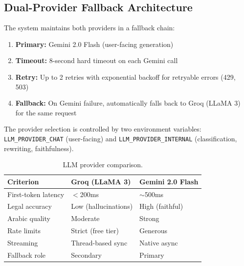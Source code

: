 \documentclass[12pt, a4paper]{article}
\begin{document}
\subsection{Dual-Provider Fallback Architecture}

The system maintains both providers in a fallback chain:

\begin{enumerate}[leftmargin=2em]
  \item \textbf{Primary:} Gemini 2.0 Flash (user-facing generation)
  \item \textbf{Timeout:} 8-second hard timeout on each Gemini call
  \item \textbf{Retry:} Up to 2 retries with exponential backoff for
        retryable errors (429, 503)
  \item \textbf{Fallback:} On Gemini failure, automatically falls back to
        Groq (LLaMA 3) for the same request
\end{enumerate}

The provider selection is controlled by two environment variables:
\texttt{LLM\_PROVIDER\_CHAT} (user-facing) and
\texttt{LLM\_PROVIDER\_INTERNAL} (classification, rewriting, faithfulness).

\begin{table}[H]
\centering
\caption{LLM provider comparison.}
\label{tab:llm_compare}
\small
\begin{tabularx}{\textwidth}{l C{4cm} C{4cm}}
\toprule
{}\color{white}\textbf{Criterion} & \color{white}\textbf{Groq (LLaMA 3)} & \color{white}\textbf{Gemini 2.0 Flash} \\
\midrule
First-token latency & $<$200ms & $\sim$500ms \\
Legal accuracy & Low (hallucinations) & High (faithful) \\
Arabic quality & Moderate & Strong \\
Rate limits & Strict (free tier) & Generous \\
Streaming & Thread-based sync & Native async \\
Fallback role & Secondary & Primary \\
\bottomrule
\end{tabularx}
\end{table}


\end{document}
